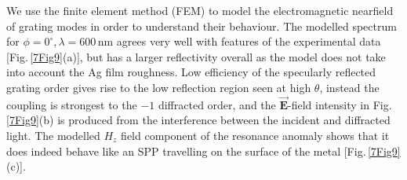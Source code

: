 We use the finite element method (FEM) to model the electromagnetic nearfield of grating modes in order to understand their behaviour. The modelled spectrum for $\phi=0^{\circ}$,\,$\lambda=600$\,nm agrees very well with features of the experimental data [Fig.\,\ref{7Fig9}(a)], but has a larger reflectivity overall as the model does not take into account the Ag film roughness. Low efficiency of the specularly reflected grating order gives rise to the low reflection region seen at high $\theta$, instead the coupling is strongest to the $-1$ diffracted order, and the $\vec{\mathbf{E}}$-field intensity in Fig.\,\ref{7Fig9}(b) is produced from the interference between the incident and diffracted light. The modelled $H_z$ field component of the resonance anomaly shows that it does indeed behave like an SPP travelling on the surface of the metal [Fig.\,\ref{7Fig9}(c)].

